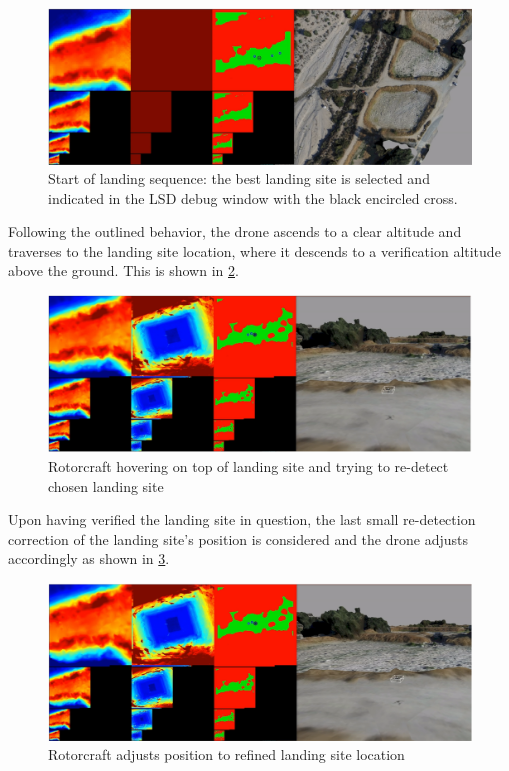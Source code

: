 \begin{figure}[h]
\centering
\includegraphics[scale=0.25]{images/autonomous_landing/demo_flight/ls_selection.png}
\caption{Start of landing sequence: the best landing site is selected and indicated in the LSD debug window with the black encircled cross.}
\label{fig:demo_ls_selection}
\end{figure}

Following the outlined behavior, the drone ascends to a clear altitude and traverses to the landing site location, where it descends to a verification altitude above the ground. This is shown in \cref{fig:demo_ver}.

\begin{figure}[h]
\centering
\includegraphics[scale=0.25]{images/autonomous_landing/demo_flight/verification.png}
\caption{Rotorcraft hovering on top of landing site and trying to re-detect chosen landing site}
\label{fig:demo_ver}
\end{figure}

Upon having verified the landing site in question, the last small re-detection correction of the landing site's position is considered and the drone adjusts accordingly as shown in \cref{fig:demo_last_correction}.

\begin{figure}[h]
\centering
\includegraphics[scale=0.25]{images/autonomous_landing/demo_flight/last_correction.png}
\caption{Rotorcraft adjusts position to refined landing site location}
\label{fig:demo_last_correction}
\end{figure}

